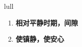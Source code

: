 
\begin{frame}
{\huge lull}
\begin{center}
\begin{enumerate}\Large
  \item \textbf{相对平静时期，间隙}
  \item \textbf{使镇静，使安心}
\end{enumerate}
\end{center}
\end{frame}

